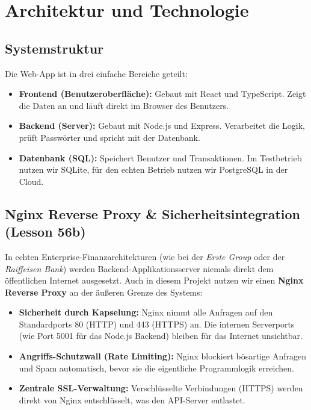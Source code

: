 \documentclass[11pt,a4paper]{article}
\begin{document}
\newpage

\section{Architektur und Technologie}

\subsection{Systemstruktur}
Die Web-App ist in drei einfache Bereiche geteilt:
\begin{itemize}
    \item \textbf{Frontend (Benutzeroberfläche):} Gebaut mit React und TypeScript. Zeigt die Daten an und läuft direkt im Browser des Benutzers.
    \item \textbf{Backend (Server):} Gebaut mit Node.js und Express. Verarbeitet die Logik, prüft Passwörter und spricht mit der Datenbank.
    \item \textbf{Datenbank (SQL):} Speichert Benutzer und Transaktionen. Im Testbetrieb nutzen wir SQLite, für den echten Betrieb nutzen wir PostgreSQL in der Cloud.
\end{itemize}

\subsection{Nginx Reverse Proxy \& Sicherheitsintegration (Lesson 56b)}
In echten Enterprise-Finanzarchitekturen (wie bei der \textit{Erste Group} oder der \textit{Raiffeisen Bank}) werden Backend-Applikationsserver niemals direkt dem öffentlichen Internet ausgesetzt. Auch in diesem Projekt nutzen wir einen \textbf{Nginx Reverse Proxy} an der äußeren Grenze des Systems:
\begin{itemize}
    \item \textbf{Sicherheit durch Kapselung:} Nginx nimmt alle Anfragen auf den Standardports 80 (HTTP) und 443 (HTTPS) an. Die internen Serverports (wie Port 5001 für das Node.js Backend) bleiben für das Internet unsichtbar.
    \item \textbf{Angriffs-Schutzwall (Rate Limiting):} Nginx blockiert bösartige Anfragen und Spam automatisch, bevor sie die eigentliche Programmlogik erreichen.
    \item \textbf{Zentrale SSL-Verwaltung:} Verschlüsselte Verbindungen (HTTPS) werden direkt von Nginx entschlüsselt, was den API-Server entlastet.
\end{itemize}
\end{document}

